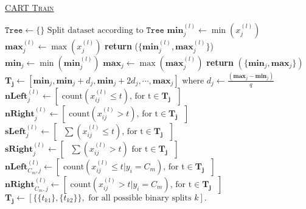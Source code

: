 \documentclass[10]{article}
\begin{document}
\begin{algorithm}
	\caption{\underline{\textsc{CART Train}}}
	\label{cart}
	\begin{algorithmic}[1] %
			\State $\texttt{Tree} \gets \{\}$
		\EndProcedure
\State {}
		\Loop
\State {}
			 
				\State $\text{Split dataset according to } \texttt{Tree}$
						\State $\mathbf{min}_j^{(l)} \gets \min(x_j^{(l)})$
						\State $\mathbf{max}_j^{(l)} \gets \max(x_j^{(l)})$
				\EndFor
				\State \textbf{return} ({$ \{\mathbf{min}_j^{(l)}, \mathbf{max}_j^{(l)}\}$})
			\EndProcedure
\State {}
					\State 	$\mathbf{min}_j \gets \min( \mathbf{min}_j^{(l)})$
					\State $\mathbf{max}_j \gets \max( \mathbf{max}_j^{(l)})$
				\EndFor
				\State \textbf{return} $ (\{\mathbf{min}_j, \mathbf{max}_j\})$
			\EndProcedure
\State {}
			 
					\State
					\State $\mathbf{T_{j}}\gets [ \mathbf{min}_j,\mathbf{min}_j+d_j,\mathbf{min}_j+2d_j,\cdots, \mathbf{max}_j ] \text{ where } {d_j} \gets \frac{(\mathbf{max}_j - \mathbf{min}_j)}{q}$
					\State {}
						\State $\mathbf{nLeft}_{j}^{(l)} \gets  [ \text{ count}{(x_{ij}^{(l)} \leq t)} \text{, for t} \in \mathbf{T_{j}} \text{ }]$
						\State $\mathbf{nRight}_{j}^{(l)} \gets [ \text{ count}{(x_{ij}^{(l)} > t)} \text{, for t} \in \mathbf{T_{j}} \text{ }]$
						\State $\mathbf{sLeft}_{j}^{(l)} \gets  [ \text{ }\sum{(x_{ij}^{(l)} \leq t)} \text{, for t} \in \mathbf{T_{j}} \text{ }]$
						\State $\mathbf{sRight}_{j}^{(l)} \gets [ \text{ }\sum{(x_{ij}^{(l)} > t)} \text{ for t} \in \mathbf{T_{j}} \text{ }]$
					\EndIf
						\State $\mathbf{nLeft}_{C_m,j}^{(l)} \gets  [ \text{ count}{(x^{(l)}_{ij} \leq t | y_i =C_m)} \text{, for t} \in \mathbf{T_{j}} \text{ }]$
						\State $\mathbf{nRight}_{C_m,j}^{(l)} \gets [ \text{ count}{(x^{(l)}_{ij} > t | y_i =C_m)} \text{, for t} \in \mathbf{T_{j}} \text{ }]$
					\EndIf
				\EndFor
					\State $\mathbf{T_{j}}\gets [ \{\{t_{k1}\},\{t_{k2}\}\}, \text{ for all possible binary splits } k ].$
					\State{}


\end{algorithmic}
\end{algorithm}
\end{document}
